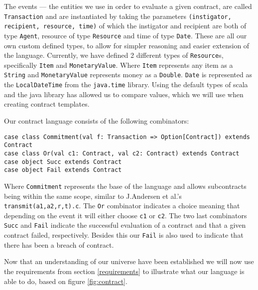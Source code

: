 \documentclass{ituthesis}
\begin{document}
The events --- the entities we use in order to evaluate a given contract, are called \texttt{Transaction} and are instantiated by taking the parameters \texttt{(instigator, recipient, resource, time)} of which the instigator and recipient are both of type \texttt{Agent}, resource of type \texttt{Resource} and time of type \texttt{Date}. These are all our own custom defined types, to allow for simpler reasoning and easier extension of the language. Currently, we have defined 2 different types of \texttt{Resource}s, specifically \texttt{Item} and \texttt{MonetaryValue}. Where \texttt{Item} represents any item as a \texttt{String} and \texttt{MonetaryValue} represents money as a \texttt{Double}. \texttt{Date} is represented as the \texttt{LocalDateTime} from the \texttt{java.time} library. Using the default types of scala and the java library has allowed us to compare values, which we will use when creating contract templates.

Our contract language consists of the following combinators:
\begin{lstlisting}
case class Commitment(val f: Transaction => Option[Contract]) extends Contract
case class Or(val c1: Contract, val c2: Contract) extends Contract
case object Succ extends Contract
case object Fail extends Contract
\end{lstlisting}

Where \texttt{Commitment} represents the base of the language and allows subcontracts being within the same scope, similar to J.Andersen et al.'s \texttt{transmit(a1,a2,r,t).c}. The \texttt{Or} combinator indicates a choice meaning that depending on the event it will either choose \texttt{c1} or \texttt{c2}. The two last combinators \texttt{Succ} and \texttt{Fail} indicate the successful evaluation of a contract and that a given contract failed, respectively. Besides this our \texttt{Fail} is also used to indicate that there has been a breach of contract.

Now that an understanding of our universe have been established we will now use the requirements from section \ref{requirements} to illustrate what our language is able to do, based on figure \ref{fig:contract}.
\end{document}
